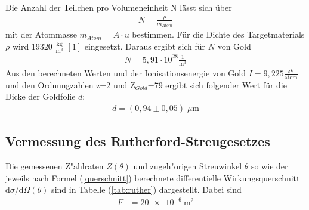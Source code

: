 Die Anzahl der Teilchen pro Volumeneinheit N lässt sich über \begin{align}
N= \frac{\rho}{m_{Atom}}
\label{form:voldichte}
\end{align} mit der Atommasse $m_{Atom}=A \cdot u$ bestimmen.
Für die Dichte des Targetmaterials $\rho$ wird 19320 $\frac{\text{kg}}{\text{m}^3}$ $[1]$ eingesetzt. Daraus ergibt sich für $N$ von Gold
 \begin{align*}
 N=5,91 \cdot 10^{28} \frac{1}{\text{m}^3}
 \end{align*}
 Aus den berechneten Werten und der Ionisationsenergie von Gold $I=9,225 \frac{\text{eV}}{\text{atom}}$ und den Ordnungzahlen z=2 und Z$_{Gold}$=79 ergibt sich folgender Wert für die Dicke der Goldfolie $d$:
 \begin{align*}
 d= ( 0,94 \pm 0,05) \; \mu \text{m}
 \end{align*}

\subsection{Vermessung des Rutherford-Streugesetzes}
  Die gemessenen Z"ahlraten $Z(\theta)$ und zugeh"origen Streuwinkel $\theta$ so wie der jeweils nach Formel (\ref{querschnitt}) berechnete differentielle Wirkungsquerschnitt $\text{d}\sigma/\text{d}\Omega(\theta)$ sind in Tabelle (\ref{tab:ruther}) dargestellt.
  Dabei sind
  \begin{align*}
    F &= \SI{20e-6}{\meter \squared} \\
  \end{align*}


